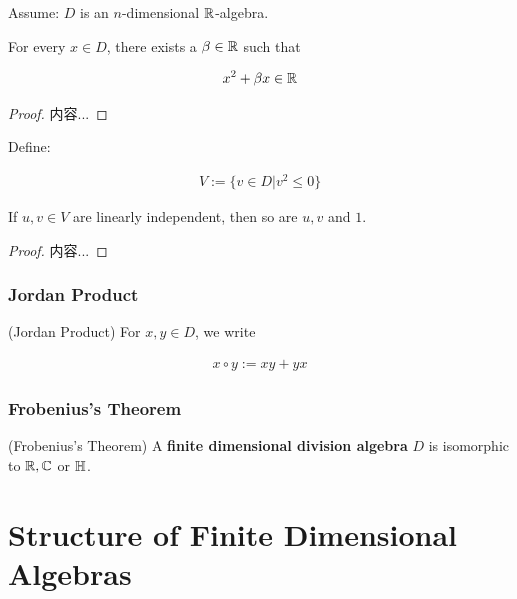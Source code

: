 \documentclass[Total.tex]{subfiles}
\begin{document}
	Assume: $D$ is an $n$-dimensional $\mathbb{R}$-algebra.
	
	\begin{lemma}
		For every $x\in D$, there exists a $\beta\in \mathbb{R}$ such that
		
		\begin{gather*}
			x^2+\beta x\in \mathbb{R}
		\end{gather*}
	\end{lemma}
	
	\begin{proof}
		内容...
	\end{proof}
	
	Define:
	
	\begin{gather*}
		V:=\{v\in D|v^2\leq 0\}
	\end{gather*}
	
	
	
	\begin{lemma}
		If $u,v\in V$ are linearly independent, then so are $u,v$ and $1$.
	\end{lemma}
	
	\begin{proof}
		内容...
	\end{proof}
	
	\subsubsection{Jordan Product}
	
	\begin{Def}
		\label{Division-Algebra-Jordan-Product}(Jordan Product) For $x,y\in D$, we write
		
		\begin{gather*}
			x\circ y:=xy+yx
		\end{gather*}
	\end{Def}
	
	\subsubsection{Frobenius's Theorem}
	
	\begin{theorem}
		\label{Division-Algebra-Frobenius-Theorem} (Frobenius's Theorem) A \textbf{finite dimensional division algebra} $D$ is isomorphic to $\mathbb{R},\mathbb{C}$ or $\mathbb{H}$.
	\end{theorem}
	
	\section{Structure of Finite Dimensional Algebras}
	
\end{document}
